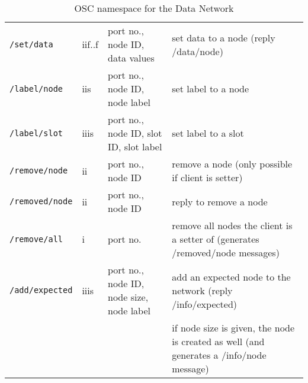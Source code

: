 \documentclass[letterpaper,10pt]{article}
\begin{document}
\begin{sidewaystable}[!tbp]
\begin{center}
\begin{tabular}{|llll|}
\verb|/set/data| & iif..f & port no., node ID, data values & set data to a node  (reply /data/node)\\

\verb|/label/node| & iis & port no., node ID, node label & set label to a node \\
\verb|/label/slot| & iiis & port no., node ID, slot ID, slot label & set label to a slot \\

\verb|/remove/node| & ii & port no., node ID & remove a node (only possible if client is setter) \\
\verb|/removed/node| & ii & port no., node ID & reply to remove a node \\
\verb|/remove/all| & i & port no. & remove all nodes the client is a setter of (generates /removed/node messages) \\

\verb|/add/expected| & iiis & port no., node ID, node size, node label & add an expected node to the network (reply /info/expected) \\
 &  &  & if node size is given, the node is created as well (and generates a /info/node message) \\
\hline
\end{tabular}
\end{center}
\caption{OSC namespace for the Data Network}
\label{oscinterface}
\end{sidewaystable}
\end{document}
